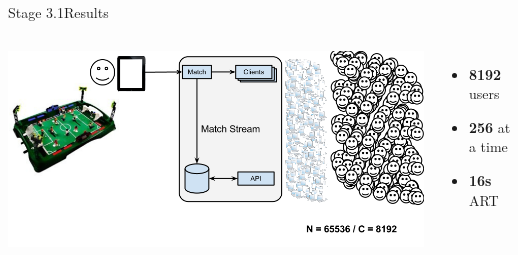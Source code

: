 \documentclass[utf8]{beamer}
\begin{document}
\begin{frame}{Stage 3.1}{Results}
	\begin{columns}
			\includegraphics[top=-1,width=\textwidth]{img/MatchStream-3.png}
			\begin{itemize}
				\item \textbf{\Large 8192} users
				\item \textbf{\Large 256} at a time
				\item \textbf{\Large 16s} ART
			\end{itemize}
	\end{columns}
\end{frame}
\end{document}

